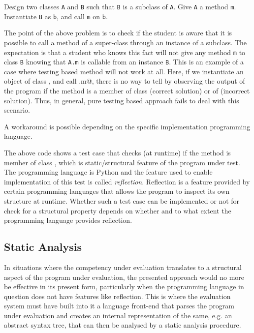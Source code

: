 \documentclass[12pt]{article}
\begin{document}
\begin{mdframed}[frametitle=Example 2]
Design two classes \lstinline[style=pc]|A| and \lstinline[style=pc]|B| such that \lstinline[style=pc]|B| is a subclass of \lstinline[style=pc]|A|. Give \lstinline[style=pc]|A| a method \lstinline[style=pc]|m|. Instantiate \lstinline[style=pc]|B| as \lstinline[style=pc]|b|, and call \lstinline[style=pc]|m| on \lstinline[style=pc]|b|. 
\end{mdframed}

The point of the above problem is to check if the student is aware that it is possible to call a method of a super-class through an instance of a subclass. The expectation is that a student who knows this fact will not give any method \lstinline[style=pc]|m| to class \lstinline[style=pc]|B| knowing that \lstinline[style=pc]|A.m| is callable from an instance \lstinline[style=pc]|B|. This is an example of a case where testing based method will not work at all. Here, if we instantiate an object \lstinline@b@ of class \lstinline@B@, and call \lstinline@b.m@, there is no way to tell by observing the output of the program if the method \lstinline@m@ is a member of class \lstinline@A@ (correct solution) or of \lstinline@B@ (incorrect solution). Thus, in general, pure testing based approach fails to deal with this scenario.

A workaround is possible depending on the specific implementation programming language.

The above code shows a test case that checks (at runtime) if the method \lstinline@m@ is member of class \lstinline@B@, which is static/structural feature of the program under test. The programming language is Python and the feature used to enable implementation of this test is called \emph{reflection}. Reflection is a feature provided by certain programming languages that allows the program to inspect its own structure at runtime. Whether such a test case can be implemented or not for check for a structural property depends on whether and to what extent the programming language provides reflection.


\subsection{Static Analysis} \label{s:aepa1}
In situations where the competency under evaluation translates to a structural aspect of the program under evaluation, the presented approach would no more be effective in its present form, particularly when the programming language in question does not have features like reflection. This is where the evaluation system must have built into it a language front-end that parses the program under evaluation and creates an internal representation of the same, e.g. an abstract syntax tree, that can then be analysed by a static analysis procedure.
\end{document}
